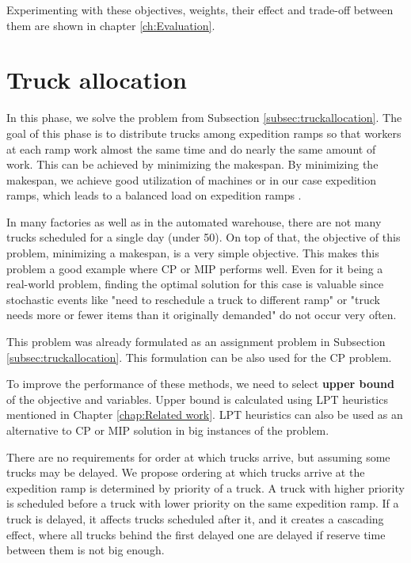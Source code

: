 \documentclass{ctuthesis}
\begin{document}
 Experimenting with these objectives, weights, their effect and trade-off between them are shown in chapter \ref{ch:Evaluation}.


\section{Truck allocation}

In this phase, we solve the problem from Subsection \ref{subsec:truckallocation}. The goal of this phase is to distribute trucks among expedition ramps so that workers at each ramp work almost the same time and do nearly the same amount of work. This can be achieved by minimizing the makespan. By minimizing the makespan, we achieve good utilization of machines or in our case expedition ramps, which leads to a balanced load on expedition ramps \cite{pinedo}. 

In many factories as well as in the automated warehouse, there are not many trucks scheduled for a single day (under 50). On top of that, the objective of this problem, minimizing a makespan, is a very simple objective. This makes this problem a good example where CP or MIP performs well. Even for it being a real-world problem, finding the optimal solution for this case is valuable since stochastic events like "need to reschedule a truck to different ramp" or "truck needs more or fewer items than it originally demanded" do not occur very often.

This problem was already formulated as an assignment problem in Subsection \ref{subsec:truckallocation}. This formulation can be also used for the CP problem.

To improve the performance of these methods, we need to select \textbf{upper bound} of the objective and variables. Upper bound is calculated using LPT heuristics mentioned in Chapter \ref{chap:Related work}. LPT heuristics can also be used as an alternative to CP or MIP solution in big instances of the problem.

There are no requirements for order at which trucks arrive, but assuming some trucks may be delayed. We propose ordering at which trucks arrive at the expedition ramp is determined by priority of a truck. A truck with higher priority is scheduled before a truck with lower priority on the same expedition ramp. If a truck is delayed, it affects trucks scheduled after it, and it creates a cascading effect, where all trucks behind the first delayed one are delayed if reserve time between them is not big enough.
\end{document}
